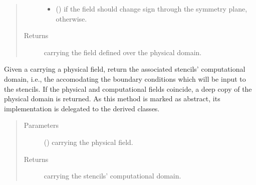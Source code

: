 \documentclass[letterpaper,10pt,english]{sphinxmanual}
\begin{document}
\begin{fulllineitems}
\begin{fulllineitems}
\begin{quote}
\begin{description}
\begin{itemize}
\item {} 
 () \textendash{}  if the field should change sign through the symmetry plane,
 otherwise.

\end{itemize}

\item[{Returns}] \leavevmode
{} carrying the field defined over the physical domain.

\end{description}\end{quote}

\end{fulllineitems}


\begin{fulllineitems}
\label{\detokenize{api:dycore.horizontal_boundary.HorizontalBoundary.from_physical_to_computational_domain}}
Given a  carrying a physical field, return the associated stencils’ computational
domain, i.e., the  accomodating the boundary conditions which will be input
to the stencils. If the physical and computational fields coincide, a deep copy of the physical
domain is returned.
As this method is marked as abstract, its implementation is delegated to the derived classes.
\begin{quote}\begin{description}
\item[{Parameters}] \leavevmode
{} () \textendash{}  carrying the physical field.

\item[{Returns}] \leavevmode
{} carrying the stencils’ computational domain.


\end{description}
\end{quote}
\end{fulllineitems}
\end{fulllineitems}
\end{document}
